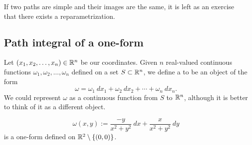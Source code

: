 If two paths are simple and their images are the same, it is
left as an exercise that there exists a reparametrization.

\subsection{Path integral of a one-form}

\begin{defn}
Let $(x_1,x_2,\ldots,x_n) \in {\mathbb{R}}^n$ be our coordinates.
Given $n$ real-valued continuous functions
$\omega_1,\omega_2,\ldots,\omega_n$ defined on a set $S \subset {\mathbb{R}}^n$,
we define a \emph{}
to be an object of the form
\begin{equation*}
\omega = \omega_1 ~dx_1 + \omega_2 ~dx_2 + \cdots + \omega_n ~dx_n .
\end{equation*}
We could represent $\omega$ as a continuous function from $S$ to ${\mathbb{R}}^n$,
although it is better to think of it as a different object.
\end{defn}

\begin{example}
\begin{equation*}
\omega(x,y) := \frac{-y}{x^2+y^2} ~dx + \frac{x}{x^2+y^2} ~dy
\end{equation*}
is a one-form defined on ${\mathbb{R}}^2 \setminus \{ (0,0) \}$.
\end{example}

